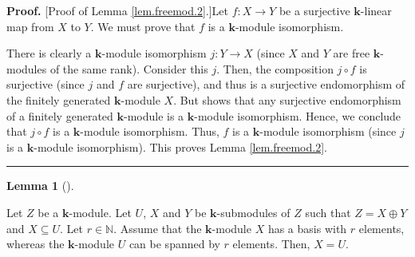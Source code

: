 \documentclass[numbers=enddot,12pt,final,onecolumn,notitlepage]{scrartcl}%
\theoremstyle{definition}
\newtheorem{lem}[theo]{Lemma}
\newenvironment{lemma}[1][]
{\begin{lem}[#1]\begin{leftbar}}
{\end{leftbar}\end{lem}}
\newenvironment{proof}[1][Proof]{\noindent\textbf{#1.} }{\ \rule{0.5em}{0.5em}}
\begin{document}
\begin{proof}
[Proof of Lemma \ref{lem.freemod.2}.]Let $f:X\rightarrow Y$ be a surjective
$\mathbf{k}$-linear map from $X$ to $Y$. We must prove that $f$ is a
$\mathbf{k}$-module isomorphism.

There is clearly a $\mathbf{k}$-module isomorphism $j:Y\rightarrow X$ (since
$X$ and $Y$ are free $\mathbf{k}$-modules of the same rank). Consider this
$j$. Then, the composition $j\circ f$ is surjective (since $j$ and $f$ are
surjective), and thus is a surjective endomorphism of the finitely generated
$\mathbf{k}$-module $X$. But \cite[Exercise 2.5.18(a)]{GriRei18} shows that
any surjective endomorphism of a finitely generated $\mathbf{k}$-module is a
$\mathbf{k}$-module isomorphism. Hence, we conclude that $j\circ f$ is a
$\mathbf{k}$-module isomorphism. Thus, $f$ is a $\mathbf{k}$-module
isomorphism (since $j$ is a $\mathbf{k}$-module isomorphism). This proves
Lemma \ref{lem.freemod.2}.
\end{proof}

\begin{lemma}
\label{lem.freemod.3}Let $Z$ be a $\mathbf{k}$-module. Let $U$, $X$ and $Y$ be
$\mathbf{k}$-submodules of $Z$ such that $Z=X\oplus Y$ and $X\subseteq U$. Let
$r\in\mathbb{N}$. Assume that the $\mathbf{k}$-module $X$ has a basis with $r$
elements, whereas the $\mathbf{k}$-module $U$ can be spanned by $r$ elements.
Then, $X=U$.
\end{lemma}
\end{document}
